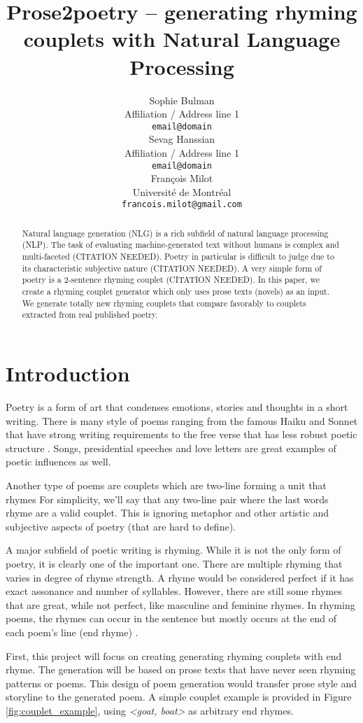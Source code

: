 \documentclass[11pt,a4paper]{article}
\title{Prose2poetry -- generating rhyming couplets with Natural Language Processing}
\author{Sophie Bulman \\
  Affiliation / Address line 1 \\
  \texttt{email@domain} \\\And
  Sevag Hanssian \\
  Affiliation / Address line 1 \\
  \texttt{email@domain} \\\And
  François Milot \\
  Université de Montréal \\
  \texttt{francois.milot@gmail.com} \\}
\date{}
\begin{document}
\maketitle
\textcolor{blue}{
\begin{abstract}
Natural language generation (NLG) is a rich subfield of natural language processing (NLP). The task of evaluating machine-generated text without humans is complex and multi-faceted (CITATION NEEDED). Poetry in particular is difficult to judge due to its characteristic subjective nature (CITATION NEEDED). A very simple form of poetry is a 2-sentence rhyming couplet (CITATION NEEDED). In this paper, we create a rhyming couplet generator which only uses prose texts (novels) as an input. We generate totally new rhyming couplets that compare favorably to couplets extracted from real published poetry.
\end{abstract}
}

\section{Introduction}

Poetry is a form of art that condenses emotions, stories and thoughts in a short writing. There is many style of poems ranging from the famous Haiku and Sonnet that have strong writing requirements to the free verse that has less robust poetic structure \citep{poem_type}. Songs, presidential speeches and love letters are great examples of poetic influences as well. 

Another type of poems are couplets which are two-line forming a unit that rhymes \cite{couplet_def} For simplicity, we'll say that any two-line pair where the last words rhyme are a valid couplet. This is ignoring metaphor and other artistic and subjective aspects of poetry (that are hard to define).

A major subfield of poetic writing is rhyming. While it is not the only form of poetry, it is clearly one of the important one. There are multiple rhyming that varies in degree of rhyme strength. A rhyme would be considered perfect if it has exact assonance and number of syllables. However, there are still some rhymes that are great, while not perfect, like masculine and feminine rhymes. In rhyming poems, the rhymes can occur in the sentence but mostly occurs at the end of each poem's line (end rhyme) \citep{poem_rhyme_type}.

First, this project will focus on creating generating rhyming couplets with end rhyme. The generation will be based on prose texts that have never seen rhyming patterns or poems. This design of poem generation would transfer prose style and storyline to the generated poem. A simple couplet example is provided in Figure \ref{fig:couplet_example}, using \textit{<goat, boat>} as arbitrary end rhymes.
\end{document}
